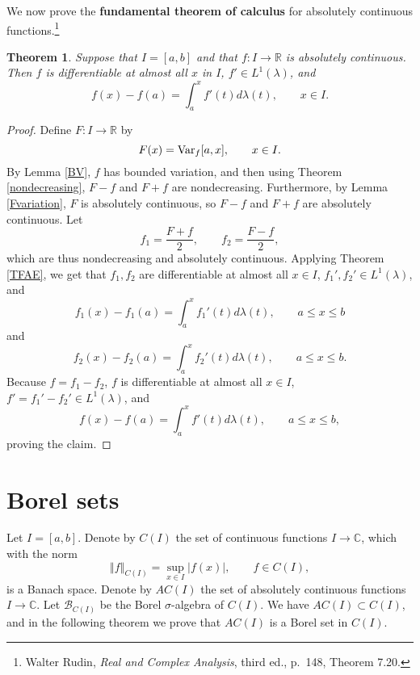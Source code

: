 \documentclass{article}
\newcommand{\Var}{\ensuremath\mathrm{Var}}
\newcommand{\norm}[1]{\left\Vert #1 \right\Vert}
\newtheorem{theorem}{Theorem}
\theoremstyle{definition}
\begin{document}
We now prove the \textbf{fundamental theorem of calculus} for absolutely continuous functions.\footnote{Walter Rudin, {\em Real and Complex Analysis}, third ed., p.~148, Theorem 7.20.}

\begin{theorem}
Suppose that $I=[a,b]$ and that $f:I \to \mathbb{R}$ is absolutely continuous. Then
$f$ is differentiable at almost all $x$ in $I$, $f' \in L^1(\lambda)$, and
\[
f(x)-f(a) = \int_a^x f'(t) d\lambda(t), \qquad x \in I.
\]
\label{FTOC}
\end{theorem}
\begin{proof}
Define
$F:I \to \mathbb{R}$  by
\[
F(x)=\Var_f[a,x], \qquad x \in I.
\]
By Lemma \ref{BV}, $f$ has bounded variation, and then using Theorem \ref{nondecreasing}, $F-f$ and $F+f$ are nondecreasing. 
Furthermore, by Lemma \ref{Fvariation}, $F$ is absolutely continuous, so $F-f$ and $F+f$ are absolutely continuous.
Let
\[
f_1 = \frac{F+f}{2}, \qquad f_2 = \frac{F-f}{2},
\]
which are thus nondecreasing and absolutely continuous.
Applying Theorem \ref{TFAE}, we get that $f_1,f_2$
are differentiable at almost all $x \in I$, $f_1',f_2' \in L^1(\lambda)$, and 
\[
f_1(x)-f_1(a)=\int_a^x f_1'(t) d\lambda(t), \qquad a \leq x \leq b
\]
and
\[
f_2(x)-f_2(a)=\int_a^x f_2'(t) d\lambda(t), \qquad a \leq x \leq b.
\]
Because $f=f_1-f_2$, $f$ is differentiable at almost all $x \in I$, $f'=f_1'-f_2' \in L^1(\lambda)$,
and
\[
f(x) - f(a) = \int_a^x f'(t) d\lambda(t), \qquad a \leq x \leq b,
\]
proving the claim.
\end{proof}


\section{Borel sets}
Let $I=[a,b]$.
Denote by $C(I)$ the set of continuous functions $I \to \mathbb{C}$, which with the norm
\[
\norm{f}_{C(I)} = \sup_{x \in I} |f(x)|, \qquad f \in C(I),
\]
is a Banach space. 
Denote by  $AC(I)$ the set of absolutely continuous functions $I \to \mathbb{C}$. 
Let $\mathscr{B}_{C(I)}$ be the Borel $\sigma$-algebra of $C(I)$. We have $AC(I) \subset C(I)$, and in the following
theorem we prove that $AC(I)$ is a Borel set in $C(I)$. 
\end{document}
